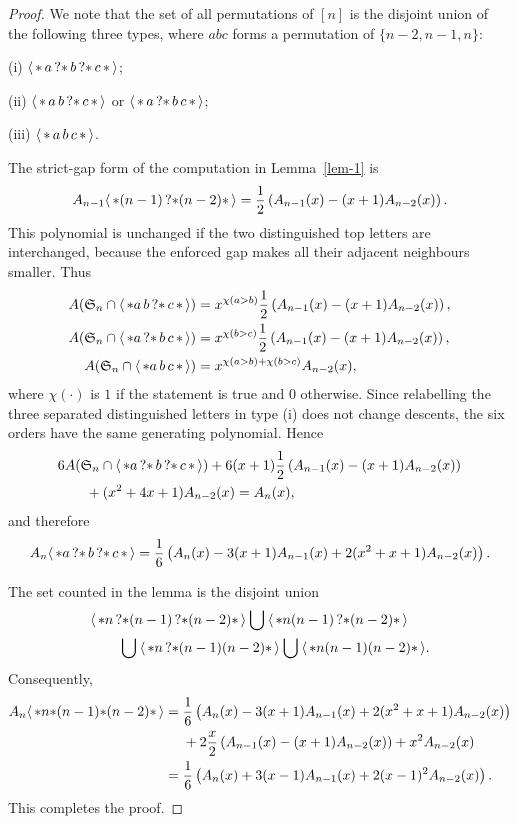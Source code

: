 \documentclass[10pt,a4paper]{amsart}
\newcommand{\glob}[1]{\ensuremath{\langle\, #1\,\rangle}}
\newcommand{\st}{\mbox{\ensuremath{\ast}}}
\newcommand{\sym}{\mathfrak{S}}
\begin{document}
\begin{proof}
	We note that the set of all permutations of $[n]$ is the disjoint union of the following three types, where $abc$ forms a permutation of $\{n-2,n-1,n\}$:
	
	(i) $\glob{\st\,a\,?\st\,b\,?\st\,c\,\st}$;
	
	(ii) $\glob{\st\,a\,b\,?\st\,c\,\st}$ or $\glob{\st\,a\,?\st\,b\,c\,\st}$;
	
	(iii) $\glob{\st\,a\,b\,c\,\st}$.
	
	The strict-gap form of the computation in Lemma~\ref{lem-1} is
	\[
	A_{n-1}\glob{\st(n-1)\,?\st(n-2)\st}
	=\frac12\left(A_{n-1}(x)-(x+1)A_{n-2}(x)\right).
	\]
	This polynomial is unchanged if the two distinguished top letters are interchanged, because the enforced gap makes all their adjacent neighbours smaller.
	Thus
	\begin{align*}
		A(\sym_n\cap\glob{\st a\,b\,?\st\,c\,\st})
		&=x^{\chi(a>b)}\frac12\left(A_{n-1}(x)-(x+1)A_{n-2}(x)\right),\\
		A(\sym_n\cap\glob{\st a\,?\st\,b\,c\,\st})
		&=x^{\chi(b>c)}\frac12\left(A_{n-1}(x)-(x+1)A_{n-2}(x)\right),\\
		A(\sym_n\cap\glob{\st a\,b\,c\,\st})
		&=x^{\chi(a>b)+\chi(b>c)}A_{n-2}(x),
	\end{align*}
	where $\chi(\cdot)$ is $1$ if the statement is true and $0$ otherwise. Since relabelling the three separated distinguished letters in type (i) does not change descents, the six orders have the same generating polynomial. Hence
	\begin{align*}
		&6A(\sym_n\cap\glob{\st a\,?\st\,b\,?\st\,c\,\st})
		+6(x+1)\frac12\left(A_{n-1}(x)-(x+1)A_{n-2}(x)\right)\\
		&\qquad +(x^2+4x+1)A_{n-2}(x)=A_n(x),
	\end{align*}
	and therefore
	\begin{align*}
		A_n\glob{\st a\,?\st\,b\,?\st\,c\,\st}
		=\frac16\left(A_n(x)-3(x+1)A_{n-1}(x)+2(x^2+x+1)A_{n-2}(x)\right).
	\end{align*}
	
	The set counted in the lemma is the disjoint union
	\begin{align*}
		&\glob{\st n\,?\st(n-1)\,?\st(n-2)\st}
		\mathbin{\bigcup}\glob{\st n(n-1)\,?\st(n-2)\st}\\
		&\qquad\mathbin{\bigcup}\glob{\st n\,?\st(n-1)(n-2)\st}
		\mathbin{\bigcup}\glob{\st n(n-1)(n-2)\st}.
	\end{align*}
	Consequently,
	\begin{align*}
		A_n\glob{\st n\st(n-1)\st(n-2)\st}
		={}&\frac16\left(A_n(x)-3(x+1)A_{n-1}(x)+2(x^2+x+1)A_{n-2}(x)\right)\\
		&+2\frac{x}{2}\left(A_{n-1}(x)-(x+1)A_{n-2}(x)\right)+x^2A_{n-2}(x)\\
		={}&\frac16\left(A_n(x)+3(x-1)A_{n-1}(x)+2(x-1)^2A_{n-2}(x)\right).
	\end{align*}
	This completes the proof.
\end{proof}
\end{document}
